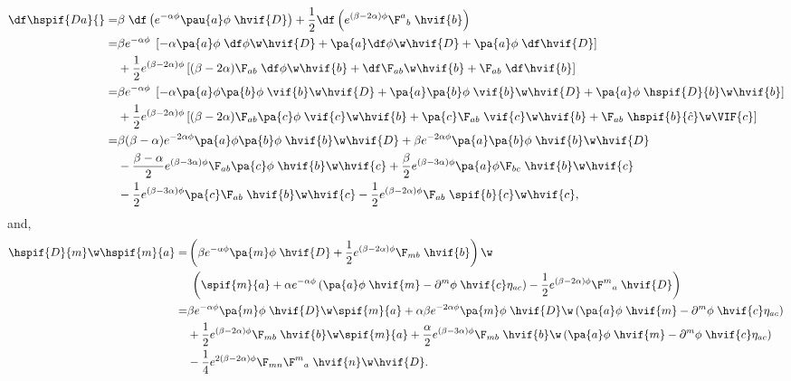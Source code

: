 \begin{align}
  \df\hspif{D a}{} 
  =& \beta\;\df\left( e^{-\alpha\phi}\pau{a}\phi\;\hvif{D}\right) + \frac{1}{2}\df\left(e^{(\beta-2\alpha)\phi}\F^a{}_{b}\;\hvif{b}\right)\nonumber\\
  =& \beta e^{-\alpha\phi}\;\left[-\alpha \pa{a}\phi\;\df\phi\w\hvif{D} +\pa{a}\df\phi\w\hvif{D} + \pa{a}\phi\;\df\hvif{D}\right]\notag\\
  & + \frac{1}{2}e^{(\beta-2\alpha)\phi}\left[(\beta-2\alpha)\F_{ab}\;\df\phi\w\hvif{b} + \df \F_{ab}\w\hvif{b} + \F_{ab}\;\df\hvif{b}\right]\nonumber\\
  =& \beta e^{-\alpha\phi}\;\left[-\alpha \pa{a}\phi\pa{b}\phi\;\vif{b}\w\hvif{D} +\pa{a}\pa{b}\phi\;\vif{b}\w\hvif{D} + \pa{a}\phi\;\hspif{D}{b}\w\hvif{b}\right] \notag\\
  &+ \frac{1}{2}e^{(\beta-2\alpha)\phi}\left[(\beta-2\alpha)\F_{ab}\pa{c}\phi\;\vif{c}\w\hvif{b} + \pa{c} \F_{ab}\;\vif{c}\w\hvif{b} + \F_{ab}\;\hspif{b}{\hat{c}}\w\VIF{c}\right]\nonumber\\
 =& \beta(\beta-\alpha)e^{-2\alpha\phi}\pa{a}\phi\pa{b}\phi\;\hvif{b}\w\hvif{D} + \beta e^{-2\alpha\phi}\pa{a}\pa{b}\phi\;\hvif{b}\w\hvif{D}  \notag\\
 &-\frac{\beta-\alpha}{2}e^{(\beta-3\alpha)\phi}\F_{ab}\pa{c}\phi\;\hvif{b}\w\hvif{c} +\frac{\beta}{2}e^{(\beta-3\alpha)\phi}\pa{a}\phi \F_{bc}\;\hvif{b}\w\hvif{c}\nonumber\\
 & -\frac{1}{2}e^{(\beta-3\alpha)\phi}\pa{c} \F_{ab}\;\hvif{b}\w\hvif{c} - \frac{1}{2}e^{(\beta-2\alpha)\phi}\F_{ab}\; \spif{b}{c}\w\hvif{c},
\end{align}
and,
\begin{align}
  \hspif{D}{m}\w\hspif{m}{a} =& \left(\beta e^{-\alpha\phi}\pa{m}\phi\;\hvif{D} + \frac{1}{2}e^{(\beta-2\alpha)\phi}\F_{m b}\;\hvif{b}  \right)\w\notag\\
  &{}\;\left(\spif{m}{a} + \alpha e^{-\alpha\phi}\left(\pa{a}\phi\;\hvif{m} - \partial^{m}\phi\;\hvif{c}\eta_{a c}\right) - \frac{1}{2}e^{(\beta-2\alpha)\phi}\F^m{}_{ a}\;\hvif{D}  \right)\nonumber\\
 =& \beta e^{-\alpha\phi}\pa{m}\phi\;\hvif{D}\w\spif{m}{a} + \alpha\beta e^{-2\alpha\phi}\pa{m}\phi\;\hvif{D}\w\left(\pa{a}\phi\;\hvif{m} - \partial^{m}\phi\;\hvif{c}\eta_{a c}\right)\nonumber\\
 & + \frac{1}{2}e^{(\beta-2\alpha)\phi}\F_{m b}\;\hvif{b}\w\spif{m}{a} + \frac{\alpha}{2}e^{(\beta-3\alpha)\phi}\F_{m b}\;\hvif{b}\w\left(\pa{a}\phi\;\hvif{m} - \partial^{m}\phi\;\hvif{c}\eta_{a c}\right)\nonumber\\
 & -\frac{1}{4}e^{2(\beta-2\alpha)\phi}\F_{m n}\F^m{}_a\;\hvif{n}\w\hvif{D}.
\end{align}
